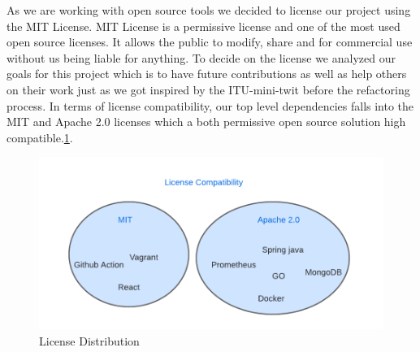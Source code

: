 As we are working with open source tools we decided to license our project using the MIT License. MIT License is a permissive license and  one of the most used open source licenses. It allows the public to modify, share and for commercial use without us being liable for anything. To decide on the license we analyzed our goals for this project which is to have future contributions as well as help others on their work just as we got inspired by the ITU-mini-twit before the refactoring process. In terms of license compatibility, our top level dependencies falls into the MIT and Apache 2.0 licenses which a both permissive open source solution high compatible.\ref{fig:license}.
\begin{figure}[h]
    \centering
    \includegraphics[width = .8\textwidth]{images/License.png}
    \caption{License Distribution}
    \label{fig:license}
\end{figure}